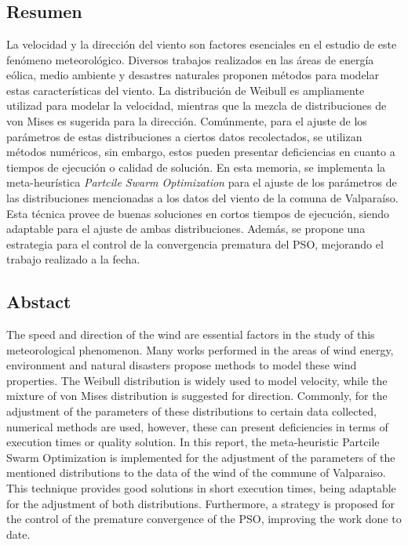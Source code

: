 \documentclass[12pt, letterpaper, oneside]{book}
\begin{document}
\frontmatter
\thispagestyle{empty}

\newpage
\chapter*{ }
\vspace{-3cm}
\newpage


\chapter*{ }
\vspace{-3cm}
\section*{Resumen}
La velocidad y la dirección del viento son factores esenciales en el estudio de este fenómeno meteorológico. Diversos trabajos realizados en las áreas de energía eólica, medio ambiente y desastres naturales proponen métodos para modelar estas características del viento. La distribución de Weibull es ampliamente utilizad para modelar la velocidad, mientras que la mezcla de distribuciones de von Mises es sugerida para la dirección. Comúnmente, para el ajuste de los parámetros de estas distribuciones a ciertos datos recolectados, se utilizan métodos numéricos, sin embargo, estos pueden presentar deficiencias en cuanto a tiempos de ejecución o calidad de solución. En esta memoria, se implementa la meta-heurística \emph{Partcile Swarm Optimization} para el ajuste de los parámetros de las distribuciones mencionadas a los datos del viento de la comuna de Valparaíso. Esta técnica provee de buenas soluciones en cortos tiempos de ejecución, siendo adaptable para el ajuste de ambas distribuciones. Además, se propone una estrategia para el control de la convergencia prematura del PSO, mejorando el trabajo realizado a la fecha.
\section*{Abstact}
The speed and direction of the wind are essential factors in the study of this meteorological phenomenon. Many works performed in the areas of wind energy, environment and natural disasters propose methods to model these wind properties. The Weibull distribution is widely used to model velocity, while the mixture of von Mises distribution is suggested for direction. Commonly, for the adjustment of the parameters of these distributions to certain data collected, numerical methods are used, however, these can present deficiencies in terms of execution times or quality solution. In this report, the meta-heuristic Partcile Swarm Optimization is implemented for the adjustment of the parameters of the mentioned distributions to the data of the wind of the commune of Valparaiso. This technique provides good solutions in short execution times, being adaptable for the adjustment of both distributions. Furthermore, a strategy is proposed for the control of the premature convergence of the PSO, improving the work done to date.
\newpage
\end{document}
